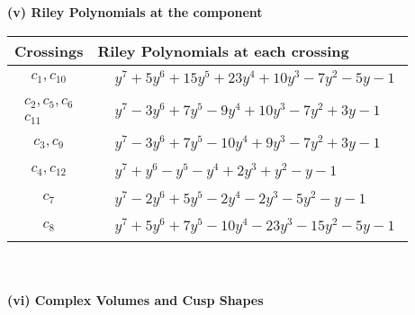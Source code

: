 \documentclass[1p]{elsarticle_modified}
\theoremstyle{definition}
\begin{document}
\newpage\renewcommand{\arraystretch}{1}
\flushleft \textbf{(v) Riley Polynomials at the component}\newline \\
\begin{tabular}{m{50pt}|m{274pt}}
Crossings & \hspace{64pt}Riley Polynomials at each crossing \\
\hline $$\begin{aligned}c_{1},c_{10}\end{aligned}$$&$\begin{aligned}
&y^7+5 y^6+15 y^5+23 y^4+10 y^3-7 y^2-5 y-1
\end{aligned}$\\
\hline $$\begin{aligned}c_{2},c_{5},c_{6}\\c_{11}\end{aligned}$$&$\begin{aligned}
&y^7-3 y^6+7 y^5-9 y^4+10 y^3-7 y^2+3 y-1
\end{aligned}$\\
\hline $$\begin{aligned}c_{3},c_{9}\end{aligned}$$&$\begin{aligned}
&y^7-3 y^6+7 y^5-10 y^4+9 y^3-7 y^2+3 y-1
\end{aligned}$\\
\hline $$\begin{aligned}c_{4},c_{12}\end{aligned}$$&$\begin{aligned}
&y^7+y^6- y^5- y^4+2 y^3+y^2- y-1
\end{aligned}$\\
\hline $$\begin{aligned}c_{7}\end{aligned}$$&$\begin{aligned}
&y^7-2 y^6+5 y^5-2 y^4-2 y^3-5 y^2- y-1
\end{aligned}$\\
\hline $$\begin{aligned}c_{8}\end{aligned}$$&$\begin{aligned}
&y^7+5 y^6+7 y^5-10 y^4-23 y^3-15 y^2-5 y-1
\end{aligned}$\\
\hline
\end{tabular}\\~\\
\newpage\flushleft \textbf{(vi) Complex Volumes and Cusp Shapes}
\end{document}
